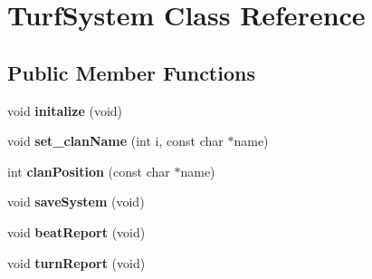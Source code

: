 \hypertarget{classTurfSystem}{\section{Turf\-System Class Reference}
\label{classTurfSystem}
}
\subsection*{Public Member Functions}
\begin{DoxyCompactItemize}
\item 
\hypertarget{classTurfSystem_af3977efc93b3e570b8b97a1aa6adb3e4}{void {\bfseries initalize} (void)}\label{classTurfSystem_af3977efc93b3e570b8b97a1aa6adb3e4}

\item 
\hypertarget{classTurfSystem_ace8f70946b1af7935824a2ba0d0b86d7}{void {\bfseries set\-\_\-clan\-Name} (int i, const char $\ast$name)}\label{classTurfSystem_ace8f70946b1af7935824a2ba0d0b86d7}

\item 
\hypertarget{classTurfSystem_adc1d992b8e40303531d08c65d0ea7ea6}{int {\bfseries clan\-Position} (const char $\ast$name)}\label{classTurfSystem_adc1d992b8e40303531d08c65d0ea7ea6}

\item 
\hypertarget{classTurfSystem_a3abfed2c71441d5d63cb57a23ef0956c}{void {\bfseries save\-System} (void)}\label{classTurfSystem_a3abfed2c71441d5d63cb57a23ef0956c}

\item 
\hypertarget{classTurfSystem_a8f881654e02c9224834ec040300f5256}{void {\bfseries beat\-Report} (void)}\label{classTurfSystem_a8f881654e02c9224834ec040300f5256}

\item 
\hypertarget{classTurfSystem_a734bb47ddd51a3376b48d18d88d4514b}{void {\bfseries turn\-Report} (void)}\label{classTurfSystem_a734bb47ddd51a3376b48d18d88d4514b}

\end{DoxyCompactItemize}
